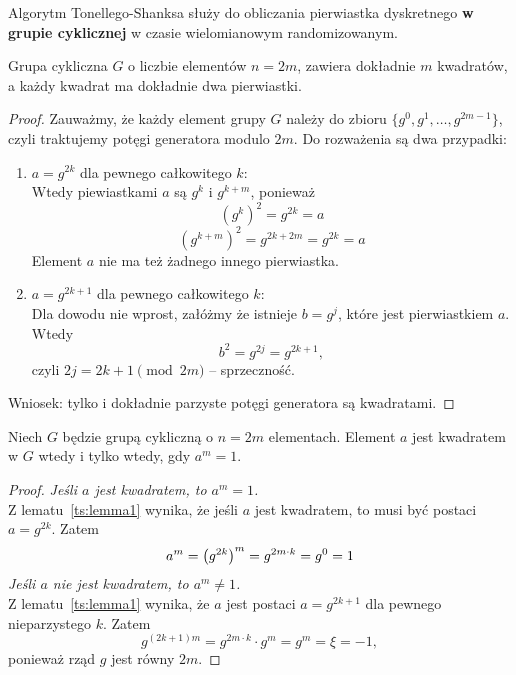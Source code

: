 Algorytm Tonellego-Shanksa służy do obliczania pierwiastka dyskretnego \textbf{w grupie cyklicznej} w czasie wielomianowym randomizowanym.

\begin{lemma}\label{ts:lemma1}
	Grupa cykliczna \( G \) o liczbie elementów \(n = 2m \), zawiera dokładnie \( m \) kwadratów, a każdy kwadrat ma dokładnie dwa pierwiastki.
\end{lemma}
\begin{proof}
	Zauważmy, że każdy element grupy \( G \) należy do zbioru \( \{g^0, g^1, \dots, g^{2m-1}\} \), czyli traktujemy potęgi generatora modulo \( 2m \). Do rozważenia są dwa przypadki:
	\begin{enumerate}
		\item \( a = g^{2k} \) dla pewnego całkowitego \( k \): \\
		      Wtedy piewiastkami \( a \) są \( g^k \) i \( g^{k+m} \), ponieważ
		      \[
			      (g^k)^2 = g^{2k} = a
		      \]
		      \[
			      (g^{k+m})^2 = g^{2k+2m} = g^{2k} = a
		      \]
		      Element \( a \) nie ma też żadnego innego pierwiastka.
		\item \( a = g^{2k+1} \) dla pewnego całkowitego \( k \): \\
		      Dla dowodu nie wprost, załóżmy że istnieje \( b = g^j \), które jest pierwiastkiem \( a \). Wtedy
		      \[
			      b^2 = g^{2j} = g^{2k + 1},
		      \]
		      czyli \( 2j = 2k + 1 \pmod{2m} \) -- sprzeczność.
	\end{enumerate}
	Wniosek: tylko i dokładnie parzyste potęgi generatora są kwadratami.
\end{proof}

\begin{lemma}\label{A11:lemma2}
	Niech \( G \) będzie grupą cykliczną o \( n = 2m \) elementach. Element \( a \) jest kwadratem w \( G \) wtedy i tylko wtedy, gdy \( a^m = 1 \).
\end{lemma}
\begin{proof}
	\textit{Jeśli \( a \) jest kwadratem, to \( a^m = 1\).} \\
	Z lematu~\ref{ts:lemma1} wynika, że jeśli \( a \) jest kwadratem, to musi być postaci \( a = g^{2k} \). Zatem
	\[
		a^m = \left(g^{2k}\right)^m = g^{2m \cdot k} = g^0 = 1
	\]
	\textit{Jeśli \( a \) nie jest kwadratem, to \( a^m \neq 1\).} \\
	Z lematu~\ref{ts:lemma1} wynika, że \( a \) jest postaci \( a = g^{2k+1} \) dla pewnego nieparzystego \( k \). Zatem
	\[
		g^{(2k+1)m} = g^{2m \cdot k} \cdot g^m = g^m = \xi = -1,
	\]
	ponieważ rząd \( g \) jest równy \( 2m \).
\end{proof}

